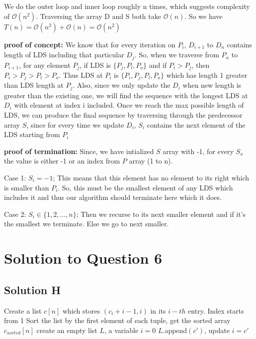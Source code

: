 \documentclass[11pt]{article}
\renewcommand{\O}{\mathcal{O}}
\begin{document}
{{ We do the outer loop and inner loop roughly n times, which suggests complexity of $\O(n^2)$. Traversing the array D and S both take $\O(n)$. So we have $T(n) = \O(n^2) + \O(n) = \O(n^2)$


{\bf proof of concept:}
We know that for every iteration on $P_i$, $D_{i+1}$ to $D_n$ contains length of LDS including that particular $D_j$.
So, when we traverse from $P_n$ to $P_{i+1}$, for any element $P_j$, if LDS is $\{P_j, P_l, P_o\}$ and if $P_i > P_j$, then $P_i > P_j > P_l > P_o$.
Thus LDS at $P_i$ is $\{P_i, P_j, P_l, P_o\}$ which has length 1 greater than LDS length at $P_j$. 
Also, since we only update the $D_i$ when new length is greater than the existing one, we will find the sequence with the longest LDS at $D_i$ with element at index i included.
Once we reach the max possible length of LDS, we can produce the final sequence by traversing through the predecessor array $S$, since for every time we update $D_i$, $S_i$ contains the next element of the LDS starting from $P_i$
 
{\bf proof of termination:}
Since, we have intialized $S$ array with -1, for every $S_x$ the value is either -1 or an index from $P$ array (1 to n).

Case 1: $S_i = -1$; This means that this element has no element to its right which is smaller than $P_i$. 
So, this must be the smallest element of any LDS which includes it and  thus our algorithm should terminate here which it does.

Case 2: $S_i \in \{1,2, \dots, n\}$; Then we recurse to  its next smaller element and if it's the smallest we terminate. Else we go to next smaller.

\section{Solution to Question 6}

\subsection{Solution H}


\begin{algorithm}
\begin{algorithmic}
  \State Create a list $c[n]$ which stores $(c_i+i-1, i)$ in its $i-th$ entry. Index starts from 1
  \State Sort the list by the first element of each tuple, get the sorted array $c_{sorted}[n]$
  \State create an empty list $L$, a variable $i = 0$
      \State $L$.append$(c')$, update $i = c'$ 
    \EndIf
  \EndFor
\end{algorithmic}
\end{algorithm}

}}
\end{document}
